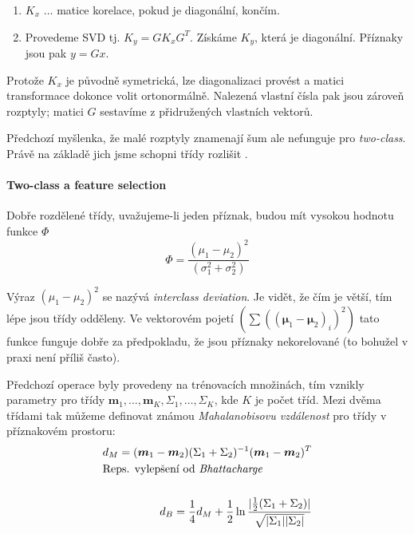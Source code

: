 \begin{enumerate}
	\item $K_x$ $\dots$ matice korelace, pokud je diagonální, končím.
	\item Provedeme SVD tj. $K_y=GK_xG^T$. Získáme $K_y$, která je diagonální. Příznaky jsou pak $y=Gx$.
\end{enumerate}

Protože $K_x$ je původně symetrická, lze diagonalizaci provést a matici transformace dokonce volit ortonormálně.
Nalezená vlastní čísla pak jsou zároveň rozptyly; matici $G$ sestavíme z přidružených vlastních vektorů.

Předchozí myšlenka, že malé rozptyly znamenají šum ale nefunguje pro \emph{two-class}. Právě na základě jich
jsme schopni třídy rozlišit .

\paragraph{Two-class a feature selection}

Dobře rozdělené třídy, uvažujeme-li jeden příznak, budou mít vysokou hodnotu funkce $\Phi$
\begin{equation}
\Phi=\frac{(\mu_1-\mu_2)^2}{(\sigma_1^2+\sigma_2^2)}
\end{equation}

Výraz $(\mu_1-\mu_2)^2$ se nazývá \emph{interclass deviation}. Je vidět, že čím je větší, tím lépe jsou třídy odděleny.
Ve vektorovém pojetí $(\sum((\bm \mu_1-\bm \mu_2)_i)^2)$ tato funkce funguje dobře za předpokladu, že jsou příznaky nekorelované (to bohužel v praxi 
není příliš často). 

Předchozí operace byly provedeny na trénovacích množinách, tím vznikly parametry pro třídy $\bm m_1, \dots, \bm m_K,
\Sigma_1,\dots,\Sigma_K$, kde $K$ je počet tříd. Mezi dvěma třídami tak můžeme definovat známou \emph{Mahalanobisovu 
	vzdálenost} pro třídy v příznakovém prostoru:
\begin{align}
d_M=(\bm m_1-\bm m_2)(\Sigma_1+\Sigma_2)^{-1}(\bm m_1-\bm m_2)^T\\
\noalign{\hbox{Reps. vylepšení od \emph{Bhattacharge}}}\\
d_B=\frac{1}{4}d_M+\frac{1}{2}\ln\frac{|\frac{1}{2}(\Sigma_1+\Sigma_2)|}{\sqrt{|\Sigma_1||\Sigma_2|}}
\end{align}

